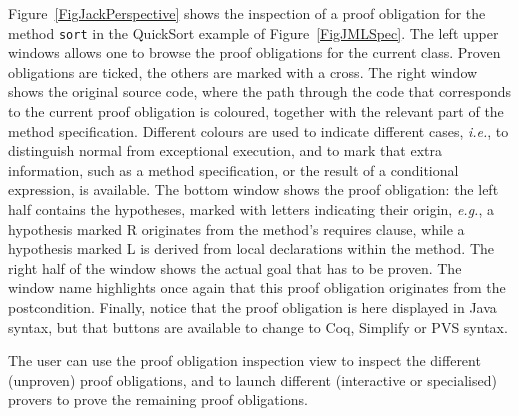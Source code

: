Figure~\ref{FigJackPerspective} shows the inspection of a proof
obligation for the method \texttt{sort} in the QuickSort example of
Figure~\ref{FigJMLSpec}. The left upper windows allows one to browse
the proof obligations for the current class. Proven obligations are
ticked, the others are marked with a cross. The right window shows the
original source code, where the path through the code that corresponds
to the current proof obligation is coloured, together with the
relevant part of the method specification. Different colours are used
to indicate different cases, \emph{i.e.}, to distinguish normal from
exceptional execution, and to mark that extra information, such as a
method specification, or the result of a conditional expression, is
available.  The bottom window shows the proof obligation: the left
half contains the hypotheses, marked with letters indicating their
origin, \emph{e.g.}, a hypothesis marked R originates from the
method's requires clause, while a hypothesis marked L is derived from
local declarations within the method. The right half of the window
shows the actual goal that has to be proven. The window name
highlights once again that this proof obligation originates from the
postcondition. Finally, notice that the proof obligation is here
displayed in Java syntax, but that buttons are available to change to
Coq, Simplify or PVS syntax.


The user can use the proof obligation inspection view to inspect the
different (unproven) proof obligations, and to launch different
(interactive or specialised) provers to prove the remaining proof
obligations.

